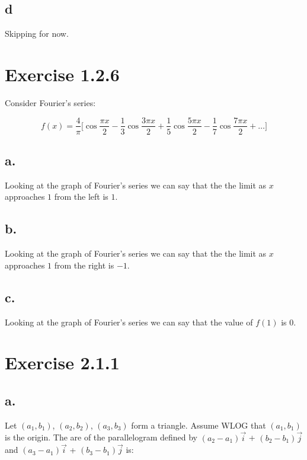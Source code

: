 \documentclass{article}
\begin{document}
\subsection*{d}
Skipping for now.

\section*{Exercise 1.2.6}

Consider Fourier's series:

\begin{equation*}
        f(x) = \frac{4}{\pi}\Big[\cos \frac{\pi x}{2} - \frac{1}{3} \cos \frac{3\pi x}{2} + \frac{1}{5} \cos \frac{5\pi x}{2} - \frac{1}{7} \cos \frac{7\pi x}{2} + \dots \Big]
\end{equation*}


\subsection*{a.}

Looking at the graph of Fourier's series we can say that the the limit as
\(x\) approaches \(1\) from the left is \(1\).

\subsection*{b.}

Looking at the graph of Fourier's series we can say that the the limit as
\(x\) approaches \(1\) from the right is \(-1\).

\subsection*{c.}

Looking at the graph of Fourier's series we can say that the value of \(f(1)\)
is \(0\).


\section*{Exercise 2.1.1}

\subsection*{a.}

Let \((a_{1}, b_{1})\), \((a_{2}, b_{2})\), \((a_{3}, b_{3})\) form a triangle. Assume WLOG that \((a_{1}, b_{1})\) is the origin.
The are of the parallelogram defined by \((a_{2} - a_{1})\vec{i}\) + \((b_{2} - b_{1})\vec{j}\) and
\((a_{3} - a_{1})\vec{i}\) + \((b_{3} - b_{1})\vec{j}\) is:
\end{document}
